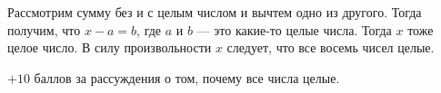\solutionSection

Рассмотрим сумму без и с целым числом и вычтем
одно из другого. Тогда получим, что $x - a = b$, где $a$ и $b$ --- это
какие-то целые числа. Тогда $x$ тоже целое число. В силу произвольности 
$x$ следует, что все восемь чисел целые.


\additionalCriteria
	$+10$ баллов за рассуждения о том, почему все числа целые.
	
